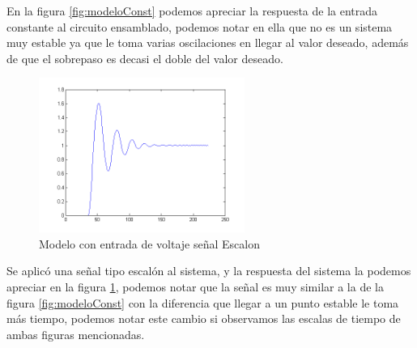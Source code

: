 \documentclass[]{article}
\begin{document}
En la figura \ref{fig:modeloConst} podemos apreciar la respuesta de la entrada constante al circuito ensamblado, podemos notar en ella que no es un sistema muy estable ya que le toma varias oscilaciones en llegar al valor deseado, además de que el sobrepaso es decasi el doble del valor deseado.\\

\begin{figure}[h!]
	\centering
	\includegraphics[width=0.6\textwidth]{modeloEscalon.png}
	\caption{Modelo con entrada de voltaje señal Escalon}
	\label{fig:modeloEscalon}
\end{figure}

Se aplicó una señal tipo escalón al sistema, y la respuesta del sistema la podemos apreciar en la figura \ref{fig:modeloEscalon}, podemos notar que la señal es muy similar a la de la figura \ref{fig:modeloConst} con la diferencia que llegar a un punto estable le toma más tiempo, podemos notar este cambio si observamos las escalas de tiempo de ambas figuras mencionadas.\\
\end{document}
